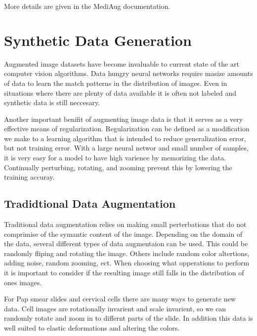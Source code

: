 \documentclass[ms,electronic,oneside,twosidetoc,letterpaper,chaptercenter,parttop]{byumsphd}
\begin{document}
\vspace{5mm}

More details are given in the MediAug documentation.


\chapter{Synthetic Data Generation}

Augmented image datasets have become invaluable to current state of the art computer vision algorithms. Data hungry 
neural networks require masize amounts of data to learn the match patterns in the distribution of images.
Even in situations where there are plenty of data available it is often not labeled and synthetic data 
is still neccesary.

Another important benifit of augmenting image data is that it serves as a very effective
means of regularization. Regularization can be defined as a modiﬁcation we make to a 
learning algorithm that is intended to reduce generalization error, but not training error.
With a large neural networ and small number of samples, it is very easy for a model to have high
varience by memorizing the data. Continually perturbing, rotating, and zooming prevent this by 
lowering the training accuray.

\section{Tradidtional Data Augmentation}

Traditional data augmentation relies on making small perterbations that do not comprimise
of the symantic content of the image. Depending on the domain of the data, several different types 
of data augmentaion can be used. This could be randomly fliping and rotating the image. Others include random color 
altertions, adding noise, random zooming, ect. When choosing what opperations to perform it is
important to consider if the resulting image still falls in the distribution of ones images.

For Pap smear slides and cervical cells there are many ways to generate new data. Cell images are
rotationally invarient and scale invarient, so we can randomly rotate and zoom in to differnt parts of the slide.
In addition this data is well suited to elastic deformations and altering the colors.
\end{document}
